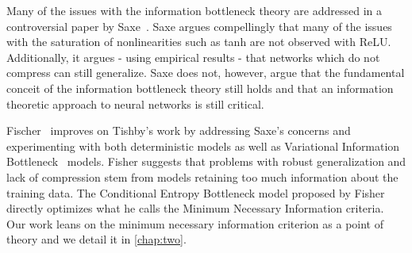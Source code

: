 Many of the issues with the information bottleneck theory are addressed in a controversial paper by Saxe~\cite{saxe2019information}.
Saxe argues compellingly that many of the issues with the saturation of nonlinearities such as tanh are not observed with ReLU.
Additionally, it argues - using empirical results - that networks which do not compress can still generalize. 
Saxe does not, however, argue that the fundamental conceit of the information bottleneck theory still holds and that an information theoretic approach to neural networks is still critical.

Fischer~\cite{fischer2020conditional} improves on Tishby's work by addressing Saxe's concerns and experimenting with both deterministic models as well as Variational Information Bottleneck~\cite{alemi2016deep} models. 
Fisher suggests that problems with robust generalization and lack of compression stem from models retaining too much information about the training data.
The Conditional Entropy Bottleneck model proposed by Fisher directly optimizes what he calls the Minimum Necessary Information criteria. 
Our work leans on the minimum necessary information criterion as a point of theory and we detail it in \ref{chap:two}.